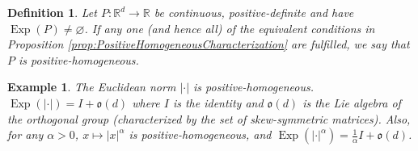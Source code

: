 \documentclass[11pt]{article}
\newtheorem{definition}[theorem]{Definition}
\newtheorem{example}{Example}
\newcommand\Exp{\operatorname{Exp}}
\begin{document}
\begin{definition}
Let $P:\mathbb{R}^d\to\mathbb{R}$ be continuous, positive-definite and have $\Exp(P)\neq \varnothing$. If any one (and hence all) of the equivalent conditions in Proposition \ref{prop:PositiveHomogeneousCharacterization} are fulfilled, we say that $P$ is positive-homogeneous.
\end{definition}



\begin{example}\label{exp:EuclideanNorm}\normalfont
The Euclidean norm $|\cdot|$ is positive-homogeneous. $\Exp(|\cdot|)=I+\mathfrak{o}(d)$ where $I$ is the identity and $\mathfrak{o}(d)$ is the Lie algebra of the orthogonal group (characterized by the set of skew-symmetric matrices). Also, for any $\alpha>0$, $x\mapsto |x|^\alpha$ is positive-homogeneous, and $\Exp(|\cdot|^{\alpha})=\frac{1}{\alpha}I+\mathfrak{o}(d)$.
\end{example}
\end{document}
